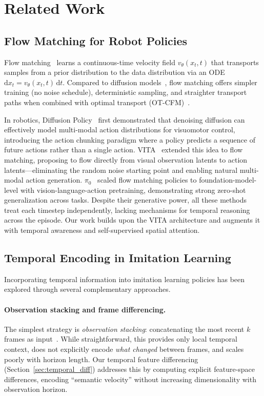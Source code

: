 \section{Related Work}
\label{sec:related_work}

\subsection{Flow Matching for Robot Policies}

Flow matching~\cite{lipman2023flow,liu2023flow} learns a continuous-time velocity field $v_\theta(x_t, t)$ that transports samples from a prior distribution to the data distribution via an ODE $\mathrm{d}x_t = v_\theta(x_t, t)\,\mathrm{d}t$. Compared to diffusion models~\cite{ho2020denoising,song2021score}, flow matching offers simpler training (no noise schedule), deterministic sampling, and straighter transport paths when combined with optimal transport (OT-CFM)~\cite{tong2024improving}.

In robotics, Diffusion Policy~\cite{chi2023diffusion} first demonstrated that denoising diffusion can effectively model multi-modal action distributions for visuomotor control, introducing the action chunking paradigm where a policy predicts a sequence of future actions rather than a single action. VITA~\cite{gao2026vita} extended this idea to flow matching, proposing to flow directly from visual observation latents to action latents---eliminating the random noise starting point and enabling natural multi-modal action generation. $\pi_0$~\cite{black2024pi0} scaled flow matching policies to foundation-model-level with vision-language-action pretraining, demonstrating strong zero-shot generalization across tasks. Despite their generative power, all these methods treat each timestep independently, lacking mechanisms for temporal reasoning across the episode. Our work builds upon the VITA architecture and augments it with temporal awareness and self-supervised spatial attention.

\subsection{Temporal Encoding in Imitation Learning}

Incorporating temporal information into imitation learning policies has been explored through several complementary approaches.

\paragraph{Observation stacking and frame differencing.} The simplest strategy is \emph{observation stacking}: concatenating the most recent $k$ frames as input~\cite{mnih2015human}. While straightforward, this provides only local temporal context, does not explicitly encode \emph{what changed} between frames, and scales poorly with horizon length. Our temporal feature differencing (Section~\ref{sec:temporal_diff}) addresses this by computing explicit feature-space differences, encoding ``semantic velocity'' without increasing dimensionality with observation horizon.

